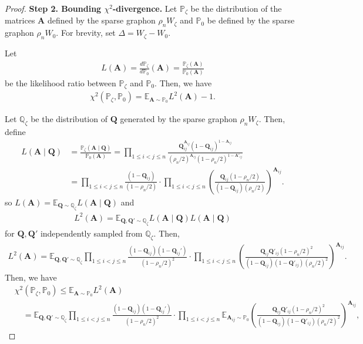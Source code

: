 \documentclass[11pt]{article}
\newcommand{\bA}{\bm{A}}
\newcommand{\bQ}{\bm{Q}}
\newcommand{\bbE}{\mathbb{E}}
\newcommand{\bbP}{\mathbb{P}}
\newcommand{\bbQ}{\mathbb{Q}}
\newcommand{\<}{\langle}
\renewcommand{\>}{\rangle}
\theoremstyle{plain}
\theoremstyle{definition}
\theoremstyle{remark}
\begin{document}
{\begin{proof}
\noindent \textbf{Step 2. Bounding $\chi^2$-divergence.} Let $\bbP_{\zeta}$ be the distribution of the matrices $\bA$ defined by the sparse graphon $\rho_n W_{\zeta}$ and $\bbP_{0}$ be defined by the sparse graphon $\rho_n W_0$. For brevity, set $\Delta = W_{\zeta} - W_0$.


Let
\begin{align*}
    L(\bA) = \frac{d \bbP_{\zeta}}{d \bbP_{0}}(\bA) = \frac{\bbP_{\zeta}(\bA)}{\bbP_0(\bA)}
\end{align*}
be the likelihood ratio between $\bbP_{\zeta}$ and $\bbP_{0}$. Then, we have
\begin{align*}
    \chi^2(\bbP_{\zeta}, \bbP_{0}) = \bbE_{\bA \sim \bbP_{0}} L^2(\bA) - 1.
\end{align*}

Let $\bbQ_{\zeta}$ be the distribution of $\bQ$ generated by the sparse graphon $\rho_n W_{\zeta}$. Then, define
\begin{align*}
    L(\bA \mid \bQ) & = \frac{\bbP_{\zeta}(\bA \mid \bQ)}{\bbP_0(\bA)} =  \prod_{1 \le i < j \le n} \frac{\bQ_{ij}^{\bA_{ij}} (1 - \bQ_{ij})^{1 - \bA_{ij}}}{(\rho_n / 2)^{\bA_{ij}} (1 - \rho_n/2)^{1 -\bA'_{ij}}} \\
    & = \prod_{1 \le i < j \le n} \frac{(1 - \bQ_{ij})}{(1 - \rho_n/2)} \cdot \prod_{1 \le i < j \le n} \left ( \frac{\bQ_{ij} (1 - \rho_n/2)}{(1 - \bQ_{ij}) (\rho_n/2)} \right )^{\bA_{ij}}.
\end{align*}
so $L(\bA) = \bbE_{\bQ \sim \bbQ_{\zeta}} L(\bA \mid \bQ)$ and
\begin{align*}
    L^2(\bA) = \bbE_{\bQ, \bQ' \sim \bbQ_{\zeta}} L(\bA \mid \bQ) L(\bA \mid \bQ)
\end{align*}
for $\bQ, \bQ'$ independently sampled from $\bbQ_{\zeta}$. Then, 
\begin{align*}
    L^2(\bA) = \bbE_{\bQ, \bQ' \sim \bbQ_{\zeta}}\prod_{1 \le i < j \le n} \frac{(1 - \bQ_{ij}) (1 - \bQ_{ij}')}{(1 - \rho_n/2)^2} \cdot \prod_{1 \le i < j \le n} \left ( \frac{\bQ_{ij} \bQ'_{ij} (1 - \rho_n/2)^2}{(1 - \bQ_{ij}) (1 - \bQ'_{ij}) (\rho_n/2)^2} \right )^{\bA_{ij}}.
\end{align*}
Then, we have
\begin{align*}
    & \chi^2(\bbP_\zeta, \bbP_0) \le \bbE_{\bA \sim \bbP_0} L^2(\bA) \\
    & \quad = \bbE_{\bQ, \bQ' \sim \bbQ_{\zeta}}\prod_{1 \le i < j \le n} \frac{(1 - \bQ_{ij}) (1 - \bQ_{ij}')}{(1 - \rho_n/2)^2} \cdot \prod_{1 \le i < j \le n} \bbE_{\bA_{ij} \sim \bbP_0} \left ( \frac{\bQ_{ij} \bQ'_{ij}  (1 - \rho_n/2)^2}{(1 - \bQ_{ij}) (1 - \bQ'_{ij}) (\rho_n/2)^2} \right )^{\bA_{ij}},

\end{align*}
\end{proof}}
\end{document}
